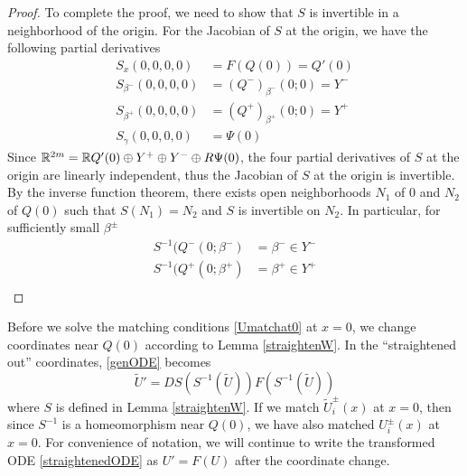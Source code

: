 \documentclass[thesis.tex]{subfiles}
\begin{document}
\begin{lemma}
\begin{proof}
To complete the proof, we need to show that $S$ is invertible in a neighborhood of the origin. For the Jacobian of $S$ at the origin, we have the following partial derivatives
\begin{align*}
S_x(0, 0, 0, 0) &= F(Q(0)) = Q'(0) \\
S_{\beta^-}(0, 0, 0, 0) &= (Q^-)_{\beta^-}(0; 0) = Y^- \\
S_{\beta^+}(0, 0, 0, 0) &= (Q^+)_{\beta^+}(0; 0) = Y^+ \\
S_{\gamma}(0, 0, 0, 0) &= \Psi(0)
\end{align*}
Since $\mathbb{R}^{2m} = \mathbb{R} Q'(0) \oplus Y^+ \oplus Y^- \oplus R \Psi(0)$, the four partial derivatives of $S$ at the origin are linearly independent, thus the Jacobian of $S$ at the origin is invertible. By the inverse function theorem, there exists open neighborhoods $N_1$ of 0 and $N_2$ of $Q(0)$ such that $S(N_1) = N_2$ and $S$ is invertible on $N_2$. In particular, for sufficiently small $\beta^\pm$
\begin{align*}
S^{-1}(Q^-(0; \beta^-) &= \beta^- \in Y^- \\
S^{-1}(Q^+(0; \beta^+) &= \beta^+ \in Y^+ \\
\end{align*}
\end{proof}
\end{lemma}

Before we solve the matching conditions \eqref{Umatchat0} at $x = 0$, we change coordinates near $Q(0)$ according to Lemma \ref{straightenW}. In the ``straightened out'' coordinates, \eqref{genODE} becomes
\begin{equation}\label{straightenedODE}
\tilde{U}' = DS(S^{-1}(\tilde{U})) F( S^{-1}(\tilde{U}) )
\end{equation}
where $S$ is defined in Lemma \ref{straightenW}. If we match $\tilde{U}_i^\pm(x)$ at $x = 0$, then since $S^{-1}$ is a homeomorphism near $Q(0)$, we have also matched $U_i^\pm(x)$ at $x = 0$. For convenience of notation, we will continue to write the transformed ODE \eqref{straightenedODE} as $U' = F(U)$ after the coordinate change.
\end{document}
